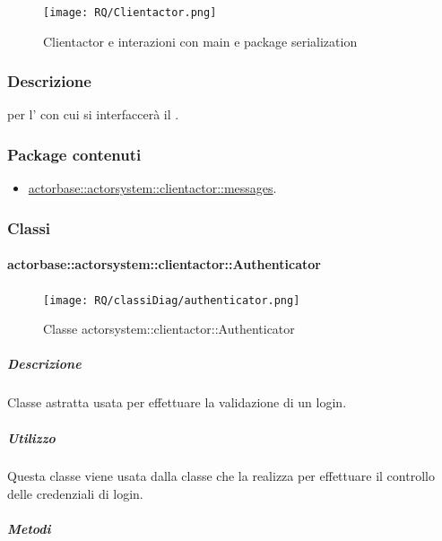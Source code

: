 \documentclass{scalatekids-article}
\begin{document}
\begin{figure}[H]
  \begin{center}
    \texttt{[image: RQ/Clientactor.png]}
    \caption{Clientactor e interazioni con main e package serialization}
  \end{center}
\end{figure}

\subsubsection{Descrizione}

 per l' con cui si interfaccerà il .

\subsubsection{Package contenuti}

\begin{itemize}
\item \hyperref[sec:actorbase::actorsystem::clientactor::messages]{actorbase::actorsystem::clientactor::messages}.
\end{itemize}

\subsubsection{Classi}

\paragraph{actorbase::actorsystem::clientactor::Authenticator}
\label{sec:actorbase::actorsystem::clientactor::Authenticator}

\begin{figure}[H]
  \begin{center}
    \texttt{[image: RQ/classiDiag/authenticator.png]}
    \caption{Classe actorsystem::clientactor::Authenticator}
  \end{center}
\end{figure}

\subparagraph{Descrizione}

Classe astratta usata per effettuare la validazione di un login.

\subparagraph{Utilizzo}

Questa classe viene usata dalla classe che la realizza per effettuare il controllo
delle credenziali di login.

\subparagraph{Metodi}
\end{document}
